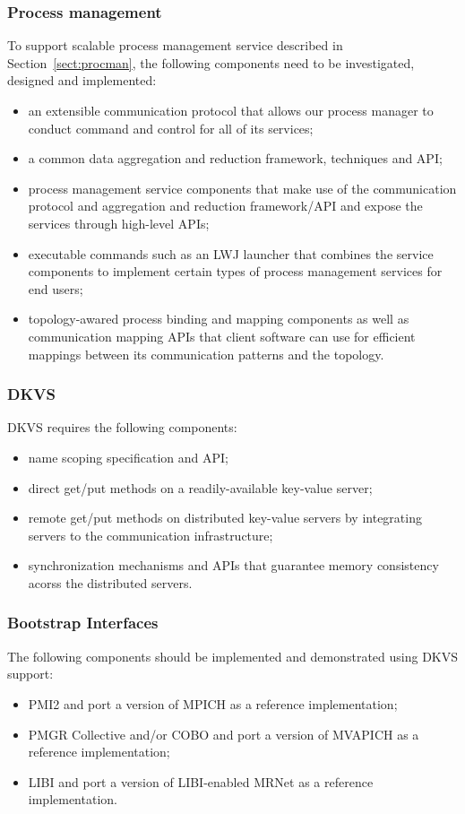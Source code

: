 \subsubsection{Process management}
To support scalable process management service described in Section~\ref{sect:procman},
the following components need to be investigated, designed and implemented:
\begin{itemize}
\item{an extensible communication protocol that allows
our process manager to conduct command and control
for all of its services;}
\item{a common data aggregation and reduction framework, techniques and API;}
\item{process management service components that
make use of the communication protocol and aggregation and reduction framework/API
and expose the services through high-level APIs;}
\item{executable commands such as an LWJ launcher that combines the
service components to implement certain types of process management
services for end users;}
\item{topology-awared process binding and mapping components as well as
communication mapping APIs that client software can use for efficient
mappings between its communication patterns and the topology.}
\end{itemize}

\subsubsection{DKVS}
DKVS requires the following components:
\begin{itemize}
\item{name scoping specification and API;}
\item{direct get/put methods on a readily-available key-value server;}
\item{remote get/put methods on distributed key-value servers by
integrating servers to the communication infrastructure;}
\item{synchronization mechanisms and APIs that guarantee memory consistency
acorss the distributed servers.}
\end{itemize}

\subsubsection{Bootstrap Interfaces}
The following components should be implemented and demonstrated
using DKVS support:
\begin{itemize}
\item{PMI2 and port a version of MPICH as a reference implementation;}
\item{PMGR Collective and/or COBO and port a version of MVAPICH as a reference implementation;}
\item{LIBI and port a version of LIBI-enabled MRNet as a reference implementation.}
\end{itemize}

